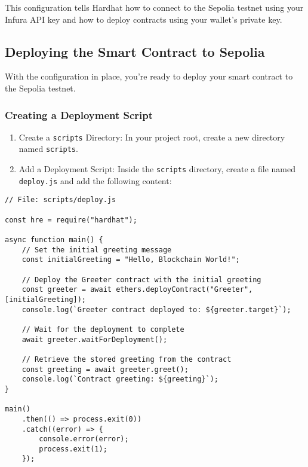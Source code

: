 \documentclass[12pt]{article}
\begin{document}
\noindent
This configuration tells Hardhat how to connect to the Sepolia testnet using your Infura API key and how to deploy contracts using your wallet's private key.

\subsection{Deploying the Smart Contract to Sepolia}

With the configuration in place, you're ready to deploy your smart contract to
the Sepolia testnet.

\subsubsection{Creating a Deployment Script}

\begin{enumerate}
    \item Create a \texttt{scripts} Directory: In your project root, create a new directory named \texttt{scripts}.
    \item Add a Deployment Script: Inside the \texttt{scripts} directory, create a file named \texttt{deploy.js} and add the following content:
\end{enumerate}

\noindent
\begin{minipage}[c]{\textwidth}
    \begin{verbatim}
// File: scripts/deploy.js

const hre = require("hardhat");

async function main() {
    // Set the initial greeting message
    const initialGreeting = "Hello, Blockchain World!";
    
    // Deploy the Greeter contract with the initial greeting
    const greeter = await ethers.deployContract("Greeter", [initialGreeting]);
    console.log(`Greeter contract deployed to: ${greeter.target}`);

    // Wait for the deployment to complete
    await greeter.waitForDeployment();

    // Retrieve the stored greeting from the contract
    const greeting = await greeter.greet();
    console.log(`Contract greeting: ${greeting}`);
}

main()
    .then(() => process.exit(0))
    .catch((error) => {
        console.error(error);
        process.exit(1);
    });
\end{verbatim}
\end{minipage}
\end{document}
